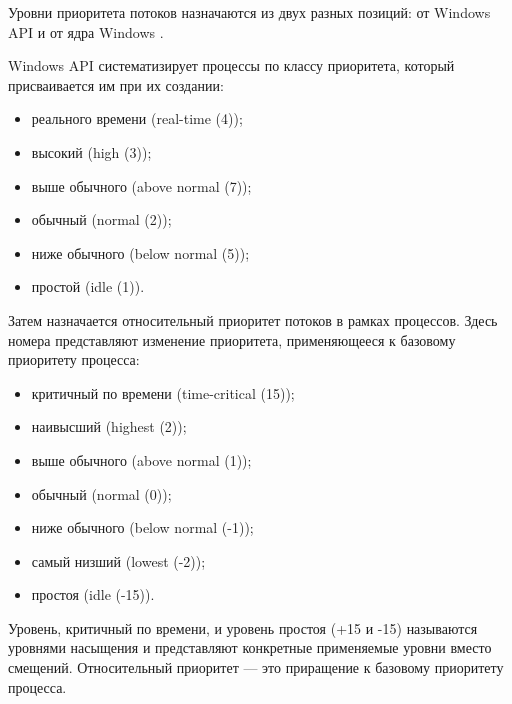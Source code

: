 \documentclass[a4paper,oneside,14pt]{extarticle}
\begin{document}
Уровни приоритета потоков назначаются из двух разных позиций: от Windows API и от ядра Windows \cite[c.~478]{windows}.

Windows API систематизирует процессы по классу приоритета, который присваивается им при их создании:
\begin{itemize}
	\item реального времени (real-time (4));
	\item высокий (high (3));
	\item выше обычного (above normal (7));
	\item обычный (normal (2));
	\item ниже обычного (below normal (5));
	\item простой (idle (1)).
\end{itemize}

Затем назначается относительный приоритет потоков в рамках процессов.
Здесь номера представляют изменение приоритета, применяющееся к базовому приоритету процесса:
\begin{itemize}
	\item критичный по времени (time-critical (15));
	\item наивысший (highest (2));
	\item выше обычного (above normal (1));
	\item обычный (normal (0));
	\item ниже обычного (below normal (-1));
	\item самый низший (lowest (-2));
	\item простоя (idle (-15)).
\end{itemize}

Уровень, критичный по времени, и уровень простоя (+15 и -15) называются уровнями насыщения и представляют конкретные применяемые уровни вместо смещений.
Относительный приоритет --- это приращение к базовому приоритету процесса.
\end{document}
